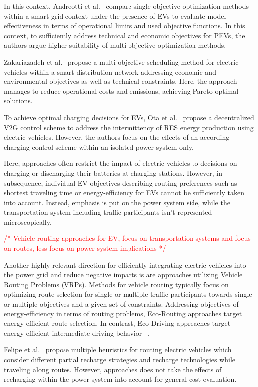 \documentclass[conference]{IEEEtran}
\newcommand{\todo}[1]{\textcolor{red}{/* #1 */}}
\begin{document}
	In this context, Andreotti et al.~\cite{andreotti2012review} compare single-objective optimization methods within a smart grid context under the presence of EVs to evaluate model effectiveness in terms of operational limits and used objective functions. In this context, to sufficiently address technical and economic objectives for PEVs, the authors argue higher suitability of multi-objective optimization methods. 
	
	Zakariazadeh et al.~\cite{zakariazadeh2014multi} propose a multi-objective scheduling method for electric vehicles within a smart distribution network addressing economic and environmental objectives as well as technical constraints. Here, the approach manages to reduce operational costs and emissions, achieving Pareto-optimal solutions.
	
	To achieve optimal charging decisions for EVs, Ota et al.~\cite{ota2012autonomous} propose a decentralized V2G control scheme to address the intermittency of RES energy production using electric vehicles. However, the authors focus on the effects of an according charging control scheme within an isolated power system only.
	
	Here, approaches often restrict the impact of electric vehicles to decisions on charging or discharging their batteries at charging stations. However, in subsequence, individual EV objectives describing routing preferences such as shortest traveling time or energy-efficiency for EVs cannot be sufficiently taken into account. Instead, emphasis is put on the power system side, while the transportation system including traffic participants isn't represented microscopically. 
	
	\todo{Vehicle routing approaches for EV, focus on transportation systems and focus on routes, less focus on power system implications}
	
	Another highly relevant direction for efficiently integrating electric vehicles into the power grid and reduce negative impacts is are approaches utilizing Vehicle Routing Problems (VRPs). Methods for vehicle routing typically focus on optimizing route selection for single or multiple traffic participants towards single or multiple objectives and a given set of constraints. Addressing objectives of energy-efficiency in terms of routing problems, Eco-Routing approaches target energy-efficient route selection. In contrast, Eco-Driving approaches target energy-efficient intermediate driving behavior ~\cite{ericsson2006optimizing}.
	
	Felipe et al.~\cite{felipe2014heuristic} propose multiple heuristics for routing electric vehicles which consider different partial recharge strategies and recharge technologies while traveling along routes. However, approaches does not take the effects of recharging within the power system into account for general cost evaluation. 
	
\end{document}
